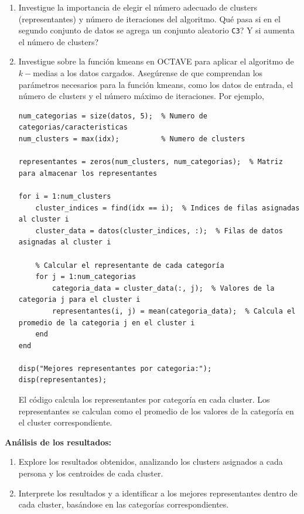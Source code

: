 \documentclass[12pt]{article}
\theoremstyle{exampstyle}
\theoremstyle{definition}
\theoremstyle{break}
\numberwithin{equation}{section}
\begin{document}
\begin{enumerate}
\begin{lstlisting}
 
 [idx, centers] = kmeans (data, 3,'MaxIter',10);


 figure;
 plot (data (idx==1, 1), data (idx==1, 2),'ro');
 hold on;
 plot (data (idx==2, 1), data (idx==2, 2), 'bs');
 hold on;
 plot (data (idx==3, 1), data (idx==3, 2), 'gd');
 plot (centers (:, 1), centers (:, 2), 'kv', 'markersize', 10);
 hold off;
\end{lstlisting}
\item Investigue la importancia de elegir el número adecuado de clusters (representantes) y número de iteraciones del algoritmo. Qu\'e pasa si en el segundo conjunto de datos se agrega un conjunto aleatorio \texttt{C3}? Y si aumenta el n\'umero de clusters?

\item Investigue sobre  la función kmeans en OCTAVE para aplicar el algoritmo de $k-$medias a los datos cargados. Asegúrense de que comprendan los parámetros necesarios para la función kmeans, como los datos de entrada, el número de clusters y el número máximo de iteraciones. Por ejemplo,

 \begin{lstlisting}
num_categorias = size(datos, 5);  % Numero de categorias/caracteristicas
num_clusters = max(idx);          % Numero de clusters

representantes = zeros(num_clusters, num_categorias);  % Matriz para almacenar los representantes

for i = 1:num_clusters
    cluster_indices = find(idx == i);  % Indices de filas asignadas al cluster i
    cluster_data = datos(cluster_indices, :);  % Filas de datos asignadas al cluster i
    
    % Calcular el representante de cada categoría
    for j = 1:num_categorias
        categoria_data = cluster_data(:, j);  % Valores de la categoria j para el cluster i
        representantes(i, j) = mean(categoria_data);  % Calcula el promedio de la categoria j en el cluster i
    end
end

disp("Mejores representantes por categoria:");
disp(representantes);

\end{lstlisting}
    El código calcula los representantes por categoría en cada cluster. Los representantes se calculan como el promedio de los valores de la categoría en el cluster correspondiente.
\end{enumerate}


{\bf Análisis de los resultados:}
\begin{enumerate}
    \item Explore los resultados obtenidos, analizando los clusters asignados a cada persona y los centroides de cada cluster.
\item Interprete los resultados y a identificar a los mejores representantes dentro de cada cluster, basándose en las categorías correspondientes.
\end{enumerate}
\end{document}
